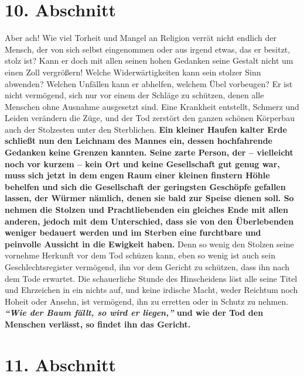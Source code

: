 \section{10. Abschnitt} \label{kap12_ab10}

Aber ach! Wie viel Torheit und Mangel an Religion verrät nicht endlich der
Mensch, der von sich selbst eingenommen oder aus irgend etwas, das er besitzt,
stolz ist? Kann er doch mit allen seinen hohen Gedanken seine Gestalt nicht um
einen Zoll vergrößern! Welche Widerwärtigkeiten kann sein stolzer Sinn abwenden?
Welchen Unfällen kann er abhelfen, welchem Übel vorbeugen? Er ist nicht
vermögend, sich nur vor einem der Schläge zu schützen, denen alle Menschen ohne
Ausnahme ausgesetzt sind.
Eine Krankheit entstellt,
Schmerz und Leiden
verändern die Züge, und der Tod zerstört den ganzen schönen Körperbau auch der
Stolzesten unter den Sterblichen.
\label{ref:12_10_eitle_menschen_tod}
\textbf{Ein kleiner Haufen kalter Erde schließt nun
den Leichnam des Mannes ein, dessen hochfahrende Gedanken keine Grenzen kannten.
Seine zarte Person, der -- vielleicht noch vor kurzem -- kein Ort und keine
Gesellschaft gut genug war, muss sich jetzt in dem engen Raum einer kleinen
finstern Höhle behelfen und sich die Gesellschaft der geringsten Geschöpfe
gefallen lassen, der Würmer nämlich, denen sie bald zur Speise dienen soll. So
nehmen die Stolzen und Prachtliebenden ein gleiches Ende mit allen anderen,
jedoch mit dem Unterschied, dass sie von den Überlebenden weniger
bedauert
werden und im Sterben eine furchtbare und peinvolle Aussicht in die Ewigkeit
haben.} Denn so wenig den Stolzen seine vornehme Herkunft vor dem Tod schüzen
kann, eben so wenig ist auch sein Geschlechtsregister vermögend, ihn vor dem
Gericht zu schützen, dass ihn nach dem Tode erwartet. Die schauerliche Stunde
des Hinscheidens löst alle seine Titel und Ehrzeichen in ein nichts auf, und
keine irdische Macht, weder Reichtum noch Hoheit oder Ansehn, ist vermögend,
ihn zu erretten oder in Schutz zu nehmen. \textbf{\textit{"`Wie der Baum fällt,
so wird er
liegen,"'} und wie der Tod den Menschen verlässt, so findet ihn das Gericht.}

\section{11. Abschnitt} \label{kap12_ab11}

